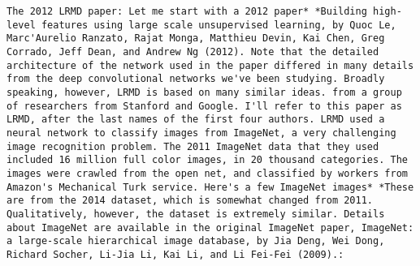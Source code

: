 \begin{lstlisting}
The 2012 LRMD paper: Let me start with a 2012 paper* *Building high-level features using large scale unsupervised learning, by Quoc Le, Marc'Aurelio Ranzato, Rajat Monga, Matthieu Devin, Kai Chen, Greg Corrado, Jeff Dean, and Andrew Ng (2012). Note that the detailed architecture of the network used in the paper differed in many details from the deep convolutional networks we've been studying. Broadly speaking, however, LRMD is based on many similar ideas. from a group of researchers from Stanford and Google. I'll refer to this paper as LRMD, after the last names of the first four authors. LRMD used a neural network to classify images from ImageNet, a very challenging image recognition problem. The 2011 ImageNet data that they used included 16 million full color images, in 20 thousand categories. The images were crawled from the open net, and classified by workers from Amazon's Mechanical Turk service. Here's a few ImageNet images* *These are from the 2014 dataset, which is somewhat changed from 2011. Qualitatively, however, the dataset is extremely similar. Details about ImageNet are available in the original ImageNet paper, ImageNet: a large-scale hierarchical image database, by Jia Deng, Wei Dong, Richard Socher, Li-Jia Li, Kai Li, and Li Fei-Fei (2009).:


\end{lstlisting}
